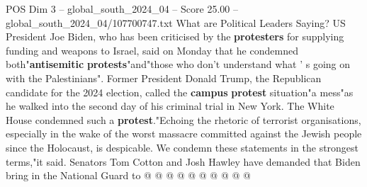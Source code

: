 \begin{textsample}{POS Dim 3 – global\_south\_2024\_04 – Score 25.00 – global\_south\_2024\_04/107700747.txt}
What are Political Leaders Saying?
US President Joe Biden, who has been criticised by the \textbf{protesters} for supplying funding and weapons to Israel, said on Monday that he condemned both"\textbf{antisemitic} \textbf{protests}"and"those who don't understand what ' s going on with the Palestinians".
Former President Donald Trump, the Republican candidate for the 2024 election, called the \textbf{campus} \textbf{protest} situation"a mess"as he walked into the second day of his criminal trial in New York.
The White House condemned such a \textbf{protest}."Echoing the rhetoric of terrorist organisations, especially in the wake of the worst massacre committed against the Jewish people since the Holocaust, is despicable.
We condemn these statements in the strongest terms,"it said.
Senators Tom Cotton and Josh Hawley have demanded that Biden bring in the National Guard to @ @ @ @ @ @ @ @ @ @

\end{textsample}

